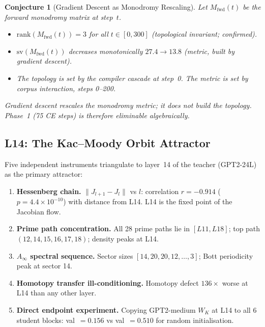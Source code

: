 \documentclass[11pt]{amsart}
\newtheorem{conjecture}[theorem]{Conjecture}
\begin{document}
\begin{conjecture}[Gradient Descent as Monodromy Rescaling]
\label{thm:monodromy}
Let $M_\mathrm{fwd}(t)$ be the forward monodromy matrix at step~$t$.
\begin{itemize}
  \item $\mathrm{rank}(M_\mathrm{fwd}(t)) = 3$ for all $t\in[0,300]$
    (topological invariant; confirmed).
  \item $\mathrm{sv}(M_\mathrm{fwd}(t))$ decreases monotonically
    $27.4 \to 13.8$ (metric, built by gradient descent).
  \item The topology is set by the compiler cascade at step~0.
    The metric is set by corpus interaction, steps 0--200.
\end{itemize}
Gradient descent rescales the monodromy metric;
it does not build the topology.
Phase~1 (75 CE steps) is therefore eliminable algebraically.
\end{conjecture}

\subsection{L14: The Kac--Moody Orbit Attractor}

Five independent instruments triangulate to layer~14 of the
teacher (GPT2-24L) as the primary attractor:

\begin{enumerate}
  \item \textbf{Hessenberg chain.}
    $\|J_{l+1}-J_l\|$ vs $l$: correlation $r=-0.914$
    ($p=4.4\times10^{-10}$) with distance from L14.
    L14 is the fixed point of the Jacobian flow.

  \item \textbf{Prime path concentration.}
    All 28 prime paths lie in $[L11,L18]$;
    top path $(12,14,15,16,17,18)$; density peaks at L14.

  \item \textbf{$A_\infty$ spectral sequence.}
    Sector sizes $[14,20,20,12,\ldots,3]$;
    Bott periodicity peak at sector 14.

  \item \textbf{Homotopy transfer ill-conditioning.}
    Homotopy defect $136\times$ worse at L14 than any other layer.

  \item \textbf{Direct endpoint experiment.}
    Copying GPT2-medium $W_K$ at L14 to all 6 student blocks:
    val~$=0.156$ vs val~$=0.510$ for random initialisation.
\end{enumerate}
\end{document}
